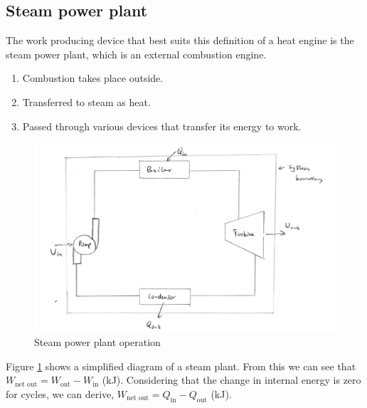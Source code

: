 \documentclass[class=report, crop=false, 12pt,a4paper]{standalone}
\begin{document}
\subsection{Steam power plant}
The work producing device that best suits this definition of a heat engine is the steam power plant, which is an external combustion engine.
\begin{enumerate}[noitemsep]
  \item Combustion takes place outside.
  \item Transferred to steam as heat.
  \item Passed through various devices that transfer its energy to work.
\end{enumerate}
\begin{figure}[H]
  \centering
    \includegraphics[width = \textwidth]{../img/SteamPowerPlantDiagram}
    \caption{Steam power plant operation}
    \label{steampowerplant}
\end{figure}
Figure \ref{steampowerplant} shows a simplified diagram of a steam plant. From this we can see that \(W_{\textrm{net out}} = W_{\textrm{out}} - W_{\textrm{in}}\) (\si{\kilo\joule}). Considering that the change in internal energy is zero for cycles, we can derive, \(W_{\textrm{net out}} = Q_{\textrm{in}} - Q_{\textrm{out}}\) (\si{\kilo\joule}).
\end{document}
